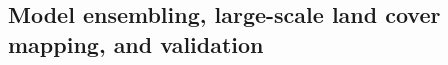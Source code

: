 




\subsection{Model ensembling, large-scale land cover mapping, and validation}\label{sec:methodology:model_ensembling}

